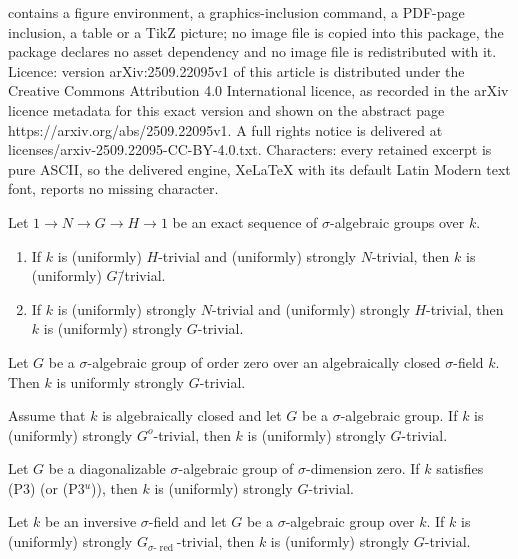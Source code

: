 \documentclass[10pt,a4paper]{amsart}
\newcommand{\ptweak}{{\rm{(P3)}}}
\newcommand{\pt}{{\rm{(P3$^u$)}}}
\newcommand{\sred}{{\sigma\text{-}\operatorname{red}}}
\newcommand{\s}{\ensuremath{\sigma}}
\begin{document}
contains a figure environment, a graphics-inclusion command, a PDF-page inclusion, a table or a TikZ picture; no image file is copied into this package, the package declares no asset dependency and no image file is redistributed with it. Licence: version arXiv:2509.22095v1 of this article is distributed under the Creative Commons Attribution 4.0 International licence, as recorded in the arXiv licence metadata for this exact version and shown on the abstract page https://arxiv.org/abs/2509.22095v1. A full rights notice is delivered at licenses/arxiv-2509.22095-CC-BY-4.0.txt. Characters: every retained excerpt is pure ASCII, so the delivered engine, XeLaTeX with its default Latin Modern text font, reports no missing character.
\begin{prop} \label{prop:InductionPrinciple}
Let $1\to N\to G\to H\to 1$ be an exact sequence of $\s$-algebraic groups over $k$.
\begin{enumerate}
    \item If $k$ is (uniformly) $H$-trivial and (uniformly) strongly $N$-trivial, then $k$ is (uniformly) $G$\=/trivial. 
    \item 	If $k$ is (uniformly) strongly $N$-trivial and (uniformly) strongly $H$-trivial, then $k$ is (uniformly) strongly $G$-trivial.
\end{enumerate}
\end{prop}

\begin{prop} \label{prop: order zero}
Let $G$ be a $\s$-algebraic group of order zero over an algebraically closed $\s$-field $k$. 
Then $k$ is uniformly strongly $G$-trivial. 
\end{prop}

\begin{cor} \label{cor: reduce to connected} Assume that $k$ is algebraically closed and let $G$ be a $\s$-algebraic group. If $k$ is (uniformly) strongly $G^o$-trivial, then $k$ is (uniformly) strongly $G$-trivial. 
\end{cor}

\begin{prop} \label{prop: proof for diagonalizable}
	Let $G$ be a diagonalizable $\s$-algebraic group of $\s$-dimension zero. If $k$ satisfies \ptweak{} (or \pt{}), then $k$ is (uniformly) strongly $G$-trivial.
\end{prop}	

\begin{lemma} \label{lemma: reduce to sredued for strongly}
	Let $k$ be an inversive $\s$-field and let $G$ be a $\s$-algebraic group over $k$. If $k$ is (uniformly) strongly $G_{\sred}$-trivial, then $k$ is (uniformly) strongly $G$-trivial.
\end{lemma}
\end{document}
